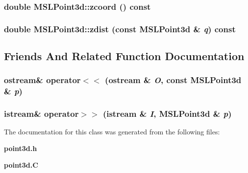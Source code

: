 \subsubsection{\setlength{\rightskip}{0pt plus 5cm}double MSLPoint3d::zcoord () const\hspace{0.3cm}{\tt  [inline]}}\label{classMSLPoint3d_a5}


\subsubsection{\setlength{\rightskip}{0pt plus 5cm}double MSLPoint3d::zdist (const MSLPoint3d \& {\em q}) const}\label{classMSLPoint3d_a12}




\subsection{Friends And Related Function Documentation}
\subsubsection{\setlength{\rightskip}{0pt plus 5cm}ostream\& operator$<$$<$ (ostream \& {\em O}, const MSLPoint3d \& {\em p})\hspace{0.3cm}{\tt  [friend]}}\label{classMSLPoint3d_l0}


\subsubsection{\setlength{\rightskip}{0pt plus 5cm}istream\& operator$>$$>$ (istream \& {\em I}, MSLPoint3d \& {\em p})\hspace{0.3cm}{\tt  [friend]}}\label{classMSLPoint3d_l1}




The documentation for this class was generated from the following files:\begin{CompactItemize}
\item 
{\bf point3d.h}\item 
{\bf point3d.C}\end{CompactItemize}
